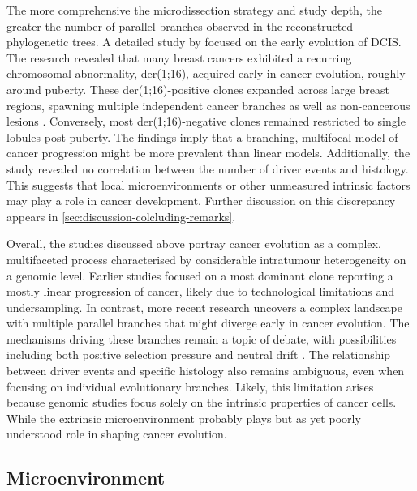 The more comprehensive the microdissection strategy and study depth, the greater the number of parallel branches observed in the reconstructed phylogenetic trees. A detailed study by \parencite{Nishimura2023-mk} focused on the early evolution of \ac{DCIS}. The research revealed that many breast cancers exhibited a recurring chromosomal abnormality, der(1;16), acquired early in cancer evolution, roughly around puberty. These der(1;16)-positive clones expanded across large breast regions, spawning multiple independent cancer branches as well as non-cancerous lesions . Conversely, most der(1;16)-negative clones remained restricted to single lobules post-puberty. The findings imply that a branching, multifocal model of cancer progression might be more prevalent than linear models. Additionally, the study revealed no correlation between the number of driver events and histology. This suggests that local microenvironments or other unmeasured intrinsic factors may play a role in cancer development. Further discussion on this discrepancy appears in \cref{sec:discussion-colcluding-remarks}.

Overall, the studies discussed above portray cancer evolution as a complex, multifaceted process characterised by considerable intratumour heterogeneity on a genomic level. Earlier studies focused on a most dominant clone reporting a mostly linear progression of cancer, likely due to technological limitations and undersampling. In contrast, more recent research uncovers a complex landscape with multiple parallel branches that might diverge early in cancer evolution. The mechanisms driving these branches remain a topic of debate, with possibilities including both positive selection pressure and neutral drift \parencite{Sottoriva2015-ci,Williams2016-qh}. The relationship between driver events and specific histology also remains ambiguous, even when focusing on individual evolutionary branches. Likely, this limitation arises because genomic studies focus solely on the intrinsic properties of cancer cells. While the extrinsic microenvironment probably plays but as yet poorly understood role in shaping cancer evolution.

\subsection{Microenvironment}

